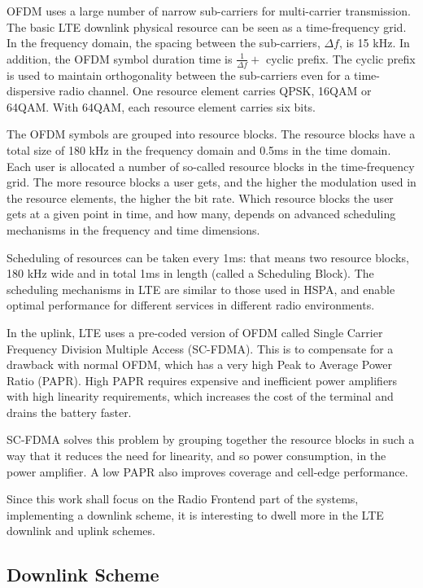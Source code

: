 OFDM uses a large number of narrow sub-carriers for multi-carrier transmission.
The basic LTE downlink physical resource can be seen as a time-frequency grid.
In the frequency domain, the spacing between the sub-carriers, $\Delta f$, is 15
kHz. In addition, the OFDM symbol duration time is $\frac{1}{\Delta f} +$ cyclic prefix.
The cyclic prefix is used to maintain orthogonality between the sub-carriers even
for a time-dispersive radio channel. One resource element carries QPSK, 16QAM or
64QAM. With 64QAM, each resource element carries six bits.

The OFDM symbols are grouped into resource blocks. The resource blocks have a
total size of 180 kHz in the frequency domain and 0.5ms in the time domain. Each
user is allocated a number of so-called resource blocks in the time-frequency grid.
The more resource blocks a user gets, and the higher the modulation used in the
resource elements, the higher the bit rate. Which resource blocks the user gets
at a given point in time, and how many, depends on advanced scheduling mechanisms
in the frequency and time dimensions.

Scheduling of resources can be taken every 1ms: that means two resource blocks,
180 kHz wide and in total 1ms in length (called a Scheduling Block). The scheduling
mechanisms in LTE are similar to those used in HSPA, and enable optimal performance
for different services in different radio environments.

In the uplink, LTE uses a pre-coded version of OFDM called Single Carrier Frequency
Division Multiple Access (SC-FDMA). This is to compensate for a drawback with normal
OFDM, which has a very high Peak to Average Power Ratio (PAPR). High PAPR requires
expensive and inefficient power amplifiers with high linearity requirements, which
increases the cost of the terminal and drains the battery faster.

SC-FDMA solves this problem by grouping together the resource blocks in such a
way that it reduces the need for linearity, and so power consumption, in the
power amplifier. A low PAPR also improves coverage and cell-edge performance.

Since this work shall focus on the Radio Frontend part of the systems, implementing
a downlink scheme, it is interesting to dwell more in the LTE downlink and uplink
schemes.

\subsection{Downlink Scheme}%


